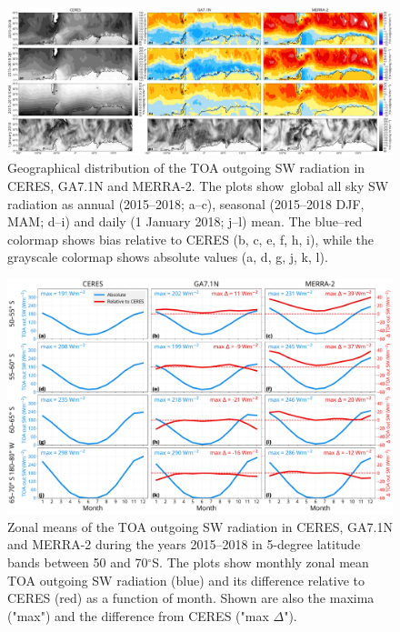\clearpage
\begin{figure}[t]
\centering
\includegraphics[width=\textwidth]{chapter2/fig/sw_up_toa_geo_rev1.png}
\caption[Geographical distribution of the TOA outgoing SW radiation in CERES, GA7.1N and
MERRA-2]{
Geographical distribution of the TOA outgoing SW radiation in CERES, GA7.1N and
MERRA-2. The plots show\ global all sky SW radiation as annual (2015--2018;
a--c), seasonal (2015--2018 DJF, MAM; d--i) and daily (1 January 2018; j--l)
mean. The blue--red colormap shows bias relative to CERES (b, c, e, f, h, i),
while the grayscale colormap shows absolute values (a, d, g, j, k, l).
}
\label{fig:sw_up_toa_geo}
\end{figure}

\clearpage
\begin{figure}[t]
\centering
\includegraphics[width=\textwidth]{chapter2/fig/sw_up_toa_time_rev1.pdf}
\caption[Zonal means of the TOA outgoing SW radiation in CERES, GA7.1N and MERRA-2]{
Zonal means of the TOA outgoing SW radiation in CERES, GA7.1N and MERRA-2
during the years 2015--2018 in 5-degree latitude bands between 50 and
70$^\circ$S. The plots show monthly zonal mean TOA outgoing SW radiation
(blue) and its difference relative to CERES (red) as a function of month. Shown
are also the maxima ("max") and the difference from CERES ("max $\Delta$").
}
\label{fig:sw_up_toa_time}
\end{figure}

